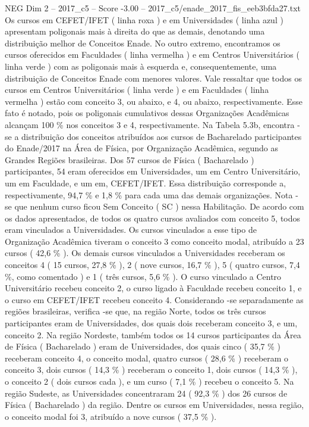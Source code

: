 \begin{textsample}{NEG Dim 2 – 2017\_c5 – Score -3.00 – 2017\_c5/enade\_2017\_fis\_eeb3bfda27.txt}
Os cursos em CEFET/IFET ( linha roxa ) e em Universidades ( linha azul ) apresentam poligonais mais à direita do que as demais, denotando uma distribuição melhor de Conceitos Enade.
No outro extremo, encontramos os cursos oferecidos em Faculdades ( linha vermelha ) e em Centros Universitários ( linha verde ) com as poligonais mais à esquerda e, consequentemente, uma distribuição de Conceitos Enade com menores valores.
Vale ressaltar que todos os cursos em Centros Universitários ( linha verde ) e em Faculdades ( linha vermelha ) estão com conceito 3, ou abaixo, e 4, ou abaixo, respectivamente.
Esse fato é notado, pois os poligonais cumulativos dessas Organizações Acadêmicas alcançam 100 \% nos conceitos 3 e 4, respectivamente.
Na Tabela 5.3b, encontra -se a distribuição dos conceitos atribuídos aos cursos de Bacharelado participantes do Enade/2017 na Área de Física, por Organização Acadêmica, segundo as Grandes Regiões brasileiras.
Dos 57 cursos de Física ( Bacharelado ) participantes, 54 eram oferecidos em Universidades, um em Centro Universitário, um em Faculdade, e um em, CEFET/IFET.
Essa distribuição corresponde a, respectivamente, 94,7 \% e 1,8 \% para cada uma das demais organizações.
Nota -se que nenhum curso ficou Sem Conceito ( SC ) nessa Habilitação.
De acordo com os dados apresentados, de todos os quatro cursos avaliados com conceito 5, todos eram vinculados a Universidades.
Os cursos vinculados a esse tipo de Organização Acadêmica tiveram o conceito 3 como conceito modal, atribuído a 23 cursos ( 42,6 \% ).
Os demais cursos vinculados a Universidades receberam os conceitos 4 ( 15 cursos, 27,8 \% ), 2 ( nove cursos, 16,7 \% ), 5 ( quatro cursos, 7,4 \%, como comentado ) e 1 ( três cursos, 5,6 \% ).
O curso vinculado a Centro Universitário recebeu conceito 2, o curso ligado à Faculdade recebeu conceito 1, e o curso em CEFET/IFET recebeu conceito 4.
Considerando -se separadamente as regiões brasileiras, verifica -se que, na região Norte, todos os três cursos participantes eram de Universidades, dos quais dois receberam conceito 3, e um, conceito 2.
Na região Nordeste, também todos os 14 cursos participantes da Área de Física ( Bacharelado ) eram de Universidades, dos quais cinco ( 35,7 \% ) receberam conceito 4, o conceito modal, quatro cursos ( 28,6 \% ) receberam o conceito 3, dois cursos ( 14,3 \% ) receberam o conceito 1, dois cursos ( 14,3 \% ), o conceito 2 ( dois cursos cada ), e um curso ( 7,1 \% ) recebeu o conceito 5.
Na região Sudeste, as Universidades concentraram 24 ( 92,3 \% ) dos 26 cursos de Física ( Bacharelado ) da região.
Dentre os cursos em Universidades, nessa região, o conceito modal foi 3, atribuído a nove cursos ( 37,5 \% ).

\end{textsample}
